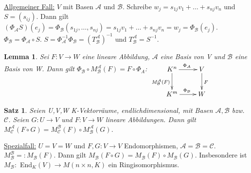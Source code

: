 \documentclass[12pt,a4paper]{article}
\theoremstyle{plain}
\newtheorem{Satz}[Theorem]{Satz}
\newtheorem{Lemma}[Theorem]{Lemma}
\numberwithin{equation}{section}
\begin{document}
\underline{Allgemeiner Fall:} $V$ mit Basen $\mathcal{A}$ und $\mathcal{B}$. Schreibe $w_j=s_{1j}v_1+\ldots+s_{nj}v_n$ und $S=(s_{ij})$. Dann gilt $(\Phi_\mathcal{A}S)(e_j)=\Phi_\mathcal{B}(s_{1j},\ldots,s_{nj})=s_{1j}v_1+\ldots+s_{nj}v_n=w_j=\Phi_\mathcal{B}(e_j)$. $\Phi_\mathcal{B}=\Phi_\mathcal{A}\circ S$. $S=\Phi^{-1}_\mathcal{A} \Phi_\mathcal{B} = (T^\mathcal{A}_\mathcal{B})^{-1}$ und $T^\mathcal{A}_\mathcal{B}=S^{-1}$.
\begin{Lemma}
Sei $F:V\rightarrow W$ eine lineare Abbildung, $\mathcal{A}$ eine Basis von V und $\mathcal{B}$ eine Basis von W. Dann gilt $\Phi_\mathcal{B}\circ M^\mathcal{A}_\mathcal{B}(F)=F\circ \Phi_A$: $ \begin{xy} \xymatrix{ 	K^n \ar[r]^{\Phi_\mathcal{A}} \ar[d]_{M^\mathcal{A}_\mathcal{B}(F)} & V \ar[d]^F \\	K^m \ar[r]^{\Phi_\mathcal{B}} & W }\end{xy} $
\end{Lemma}
\begin{Satz}
Seien U,V,W K-Vektorräume, endlichdimensional, mit Basen $\mathcal{A},\mathcal{B}$ bzw. $\mathcal{C}$. Seien $G:U\rightarrow V$ und $F: V\rightarrow W$ lineare Abbildungen. Dann gilt $M^\mathcal{A}_\mathcal{C}(F\circ G)=M^\mathcal{B}_\mathcal{C}(F)\circ M^\mathcal{A}_\mathcal{B}(G)$.
\end{Satz}
\underline{Spezialfall:} $U=V=W$ und $F,G:V\rightarrow V$ Endomorphismen, $\mathcal{A}=\mathcal{B}=\mathcal{C}$. $M^\mathcal{B}_\mathcal{B}=:M_\mathcal{B}(F)$. Dann gilt $M_\mathcal{B}(F\circ G)=M_\mathcal{B}(F)\circ M_\mathcal{B}(G)$. Insbesondere ist $M_\mathcal{B}: $ End$_K(V)\rightarrow M(n\times n,K)$ ein Ringisomorphismus.
\end{document}
